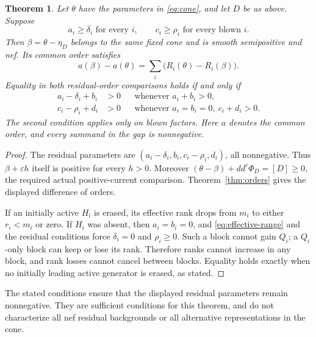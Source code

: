 \documentclass[11pt]{article}
\newtheorem{theorem}{Theorem}
\newcommand{\ddc}{dd^c}
\begin{document}
\begin{theorem}\label{thm:residual}
Let $\theta$ have the parameters in \eqref{eq:cone}, and let $D$
be as above. Suppose
\[
 a_i\geq\delta_i\text{ for every }i,
 \qquad c_i\geq\rho_i\text{ for every blown }i.
\]
Then $\beta=\theta-\eta_D$ belongs to the same fixed cone and is
smooth semipositive and nef. Its common order satisfies
\[
 a(\beta)-a(\theta)=\sum_i\bigl(R_i(\theta)-R_i(\beta)\bigr).
\]
Equality in both residual-order comparisons holds if and only if
\begin{align*}
 a_i-\delta_i+b_i&>0&&\text{whenever }a_i+b_i>0,\\
 c_i-\rho_i+d_i&>0&&\text{whenever }a_i=b_i=0,
                                  \ c_i+d_i>0.
\end{align*}
The second condition applies only on blown factors. Here $a$ denotes
the common order, and every summand in the gap is nonnegative.
\end{theorem}
\begin{proof}
The residual parameters are
$(a_i-\delta_i,b_i,c_i-\rho_i,d_i)$, all nonnegative.
Thus $\beta+\varepsilon h$ itself is positive for every $h>0$.
Moreover $(\theta-\beta)+\ddc\Phi_D=[D]\geq0$, the required
actual positive-current comparison. Theorem~\ref{thm:orders} gives
the displayed difference of orders.

If an initially active $H_i$ is erased, its effective rank drops
from $m_i$ to either $r_i<m_i$ or zero. If $H_i$ was absent, then
$a_i=b_i=0$, and \eqref{eq:effective-range} and the residual
conditions force $\delta_i=0$ and $\rho_i\geq0$. Such a block
cannot gain $Q_i$; a $Q_i$-only block can keep or lose its rank.
Therefore ranks cannot increase in any block, and rank losses cannot
cancel between blocks. Equality holds exactly when no initially
leading active generator is erased, as stated.
\end{proof}

The stated conditions ensure that the displayed residual parameters
remain nonnegative. They are sufficient conditions for this theorem,
and do not characterize all nef residual backgrounds or all alternative
representations in the cone.
\end{document}
